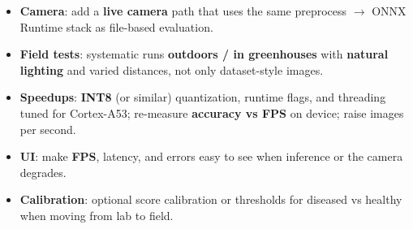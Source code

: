 \documentclass[a4paper,onesided,12pt]{report}
\begin{document}
\begin{itemize}
\item \textbf{Camera}: add a \textbf{live camera} path that uses the same preprocess $\rightarrow$ ONNX Runtime stack as file-based evaluation.
\item \textbf{Field tests}: systematic runs \textbf{outdoors / in greenhouses} with \textbf{natural lighting} and varied distances, not only dataset-style images.
\item \textbf{Speedups}: \textbf{INT8} (or similar) quantization, runtime flags, and threading tuned for Cortex-A53; re-measure \textbf{accuracy vs FPS} on device; raise images per second.
\item \textbf{UI}: make \textbf{FPS}, latency, and errors easy to see when inference or the camera degrades.
\item \textbf{Calibration}: optional score calibration or thresholds for diseased vs healthy when moving from lab to field.
\end{itemize}



\end{document}
